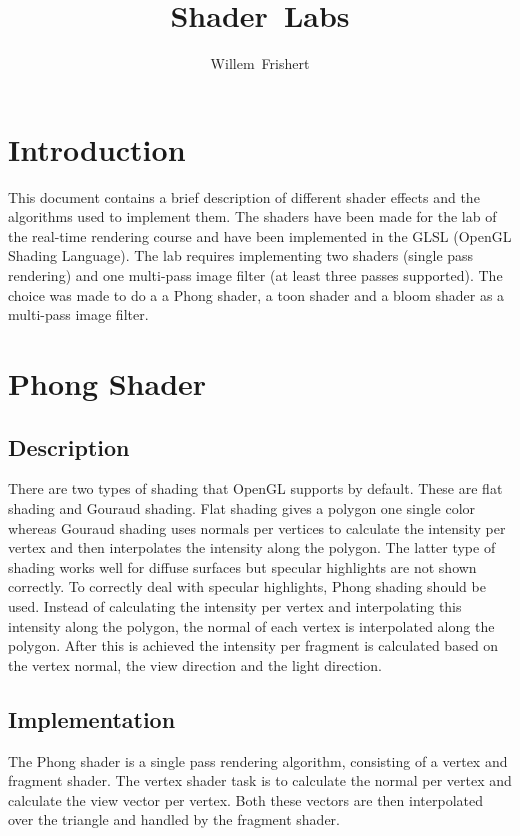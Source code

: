 \documentclass[a4paper,12pt]{article}
\author{Willem~Frishert}
\title{Shader~Labs}
\begin{document}
\maketitle

\section{Introduction}
\label{sec:Introduction}
This document contains a brief description of different shader effects and the algorithms used to implement them. The shaders have been made for the lab of the real-time rendering course and have been implemented in the GLSL (OpenGL Shading Language). The lab requires implementing two shaders (single pass rendering) and one multi-pass image filter (at least three passes supported). The choice was made to do a a Phong shader, a toon shader and a bloom shader as a multi-pass image filter.

\section{Phong Shader}
\label{sec:PhongShader}
\subsection{Description}
\label{sec:Description}

There are two types of shading that OpenGL supports by default. These are flat shading and Gouraud shading. Flat shading gives a polygon one single color whereas Gouraud shading uses normals per vertices to calculate the intensity per vertex and then interpolates the intensity along the polygon. The latter type of shading works well for diffuse surfaces but specular highlights are not shown correctly. To correctly deal with specular highlights, Phong shading should be used. Instead of calculating the intensity per vertex and interpolating this intensity along the polygon, the normal of each vertex is interpolated along the polygon. After this is achieved the intensity per fragment is calculated based on the vertex normal, the view direction and the light direction.


\subsection{Implementation}
\label{sec:ImplementationPhongShader}

The Phong shader is a single pass rendering algorithm, consisting of a vertex and fragment shader. The vertex shader task is to calculate the normal per vertex and calculate the view vector per vertex. Both these vectors are then interpolated over the triangle and handled by the fragment shader.
\end{document}

